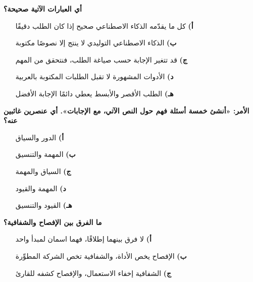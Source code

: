 \documentclass[11pt,a4paper]{article}
\begin{document}
\begin{multicols}{2}
\noindent\begin{minipage}{\linewidth}
\hangindent=0.7cm\textbf{أي العبارات الآتية صحيحة؟}
\begin{itemize}[leftmargin=0.95cm, labelsep=4pt, itemsep=0pt, topsep=2pt, parsep=0pt]
  \item[\textbf{أ)}] كل ما يقدّمه الذكاء الاصطناعي صحيح إذا كان الطلب دقيقًا
  \item[\textbf{ب)}] الذكاء الاصطناعي التوليدي لا ينتج إلا نصوصًا مكتوبة
  \item[\textbf{ج)}] قد تتغير الإجابة حسب صياغة الطلب، فنتحقق من المهم
  \item[\textbf{د)}] الأدوات المشهورة لا تقبل الطلبات المكتوبة بالعربية
  \item[\textbf{هـ)}] الطلب الأقصر والأبسط يعطي دائمًا الإجابة الأفضل
\end{itemize}
\end{minipage}\par\vspace{7pt plus 4pt}
\noindent\begin{minipage}{\linewidth}
\hangindent=0.7cm\textbf{الأمر: «أنشئ خمسة أسئلة فهم حول النص الآتي، مع الإجابات». أي عنصرين غائبين عنه؟}
\begin{itemize}[leftmargin=0.95cm, labelsep=4pt, itemsep=0pt, topsep=2pt, parsep=0pt]
  \item[\textbf{أ)}] الدور والسياق
  \item[\textbf{ب)}] المهمة والتنسيق
  \item[\textbf{ج)}] السياق والمهمة
  \item[\textbf{د)}] المهمة والقيود
  \item[\textbf{هـ)}] القيود والتنسيق
\end{itemize}
\end{minipage}\par\vspace{7pt plus 4pt}
\noindent\begin{minipage}{\linewidth}
\hangindent=0.7cm\textbf{ما الفرق بين الإفصاح والشفافية؟}
\begin{itemize}[leftmargin=0.95cm, labelsep=4pt, itemsep=0pt, topsep=2pt, parsep=0pt]
  \item[\textbf{أ)}] لا فرق بينهما إطلاقًا، فهما اسمان لمبدأ واحد
  \item[\textbf{ب)}] الإفصاح يخص الأداة، والشفافية تخص الشركة المطوِّرة
  \item[\textbf{ج)}] الشفافية إخفاء الاستعمال، والإفصاح كشفه للقارئ

\end{itemize}
\end{minipage}
\end{multicols}
\end{document}
